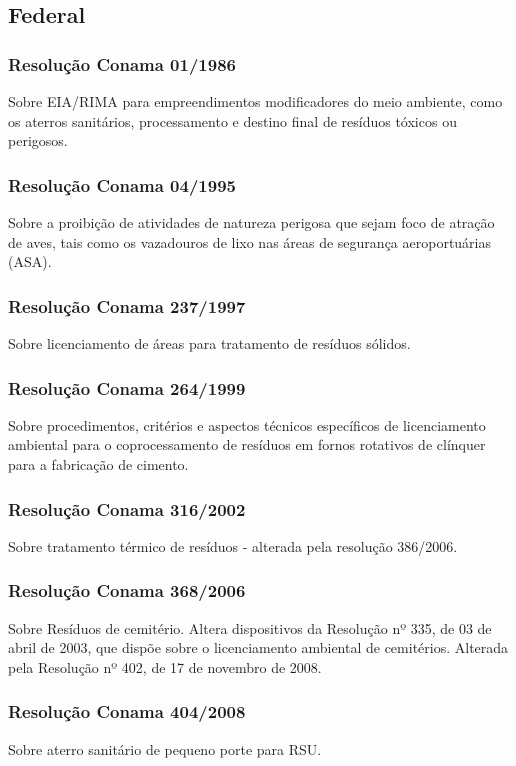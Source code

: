 \begin{subapend}
	\subsection{Federal}
	\begin{subsubapend}
		\subsubsection{Resolução Conama 01/1986}
		Sobre EIA/RIMA para empreendimentos modificadores do meio ambiente, como os aterros sanitários, processamento e destino final de resíduos tóxicos ou perigosos.
		\subsubsection{Resolução Conama 04/1995}
		Sobre a proibição de atividades de natureza perigosa que sejam foco de atração de aves, tais como os vazadouros de lixo nas áreas de segurança aeroportuárias (ASA).
		\subsubsection{Resolução Conama 237/1997}
		Sobre licenciamento de áreas para tratamento de resíduos sólidos.
		\subsubsection{Resolução Conama 264/1999}
		Sobre procedimentos, critérios e aspectos técnicos específicos de licenciamento ambiental para o coprocessamento de resíduos em fornos rotativos de clínquer para a fabricação de cimento.
		\subsubsection{Resolução Conama 316/2002}
		Sobre tratamento térmico de resíduos - alterada pela resolução 386/2006.
		\subsubsection{Resolução Conama 368/2006}
		Sobre Resíduos de cemitério. Altera dispositivos da Resolução nº 335, de 03 de abril de 2003, que dispõe sobre o licenciamento ambiental de cemitérios. Alterada pela Resolução nº 402, de 17 de novembro de 2008.
		\subsubsection{Resolução Conama 404/2008}
		Sobre aterro sanitário de pequeno porte para RSU.

\end{subsubapend}
\end{subapend}
